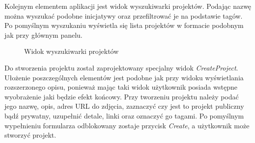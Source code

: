 \bigskip
\bigskip
\bigskip
\bigskip
\bigskip
\bigskip
\bigskip
\bigskip
\bigskip
\bigskip
\bigskip
\bigskip
\bigskip
\bigskip
\bigskip
\bigskip

Kolejnym elementem aplikacji jest widok wyszukiwarki projektów. Podając nazwę można wyszukać podobne inicjatywy oraz przefiltrować je na podstawie tagów. Po pomyślnym wyszukaniu wyświetla się lista projektów w formacie podobnym jak przy głównym panelu.



\begin{figure}[h!]
	\caption{Widok wyszukiwarki projektów}
	\centering
\end{figure}



Do stworzenia projektu został zaprojektowany specjalny widok \textit{CreateProject}. Ułożenie poszczególnych elementów jest podobne jak przy widoku wyświetlania rozszerzonego opisu, ponieważ mając taki widok użytkownik posiada wstępne wyobrażenie jaki będzie efekt końcowy. Przy tworzeniu projektu należy podać jego nazwę, opis, adres URL do zdjęcia, zaznaczyć czy jest to projekt publiczny bądź prywatny, uzupełnić detale, linki oraz oznaczyć go tagami. Po pomyślnym wypełnieniu formularza odblokowany zostaje przycisk \textit{Create}, a użytkownik może stworzyć projekt.

